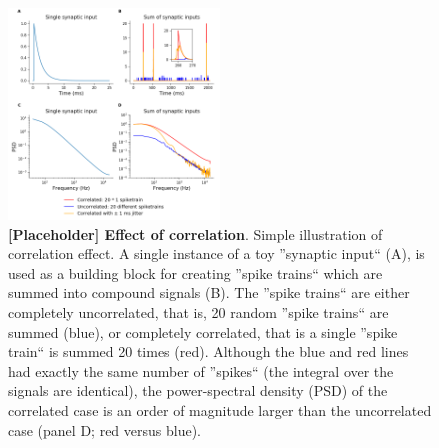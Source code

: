 \documentclass[preprint,11pt,authoryear]{elsarticle}
\begin{document}
\begin{figure}[h!]
\begin{center}
\includegraphics[width=0.5\textwidth]{correlation_jitter}
\end{center}
\caption{\textbf{[Placeholder] Effect of correlation}. Simple illustration of correlation effect. A single instance of a toy ''synaptic input`` (A), is used as a building block for creating ''spike trains`` which are summed into compound signals (B). The ''spike trains`` are either completely uncorrelated, that is, 20 random ''spike trains`` are summed (blue), or completely correlated, that is a single ''spike train`` is summed 20 times (red). Although the blue and red lines had exactly the same number of ''spikes`` (the integral over the signals are identical), the power-spectral density (PSD) of the correlated case is an order of magnitude larger than the uncorrelated case (panel D; red versus blue).}
\label{fig:correlation_effect}
\end{figure}
\end{document}
